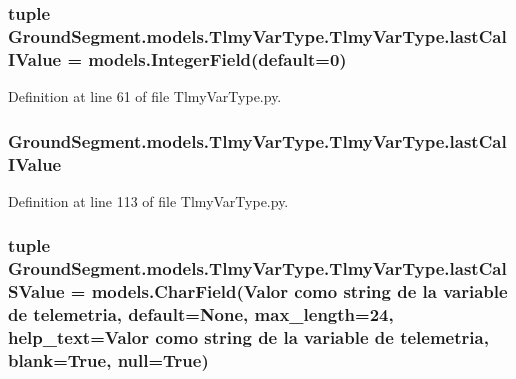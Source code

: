 \subsubsection[{last\+Cal\+I\+Value}]{\setlength{\rightskip}{0pt plus 5cm}tuple Ground\+Segment.\+models.\+Tlmy\+Var\+Type.\+Tlmy\+Var\+Type.\+last\+Cal\+I\+Value = models.\+Integer\+Field(default=0)\hspace{0.3cm}{\ttfamily [static]}}\label{class_ground_segment_1_1models_1_1_tlmy_var_type_1_1_tlmy_var_type_adb9ebf5cf2eb31fe549eadae8b7f1615}


Definition at line 61 of file Tlmy\+Var\+Type.\+py.

\hypertarget{class_ground_segment_1_1models_1_1_tlmy_var_type_1_1_tlmy_var_type_a26e2e133172878436da42acf364a07d7}{}
\subsubsection[{last\+Cal\+I\+Value}]{\setlength{\rightskip}{0pt plus 5cm}Ground\+Segment.\+models.\+Tlmy\+Var\+Type.\+Tlmy\+Var\+Type.\+last\+Cal\+I\+Value}\label{class_ground_segment_1_1models_1_1_tlmy_var_type_1_1_tlmy_var_type_a26e2e133172878436da42acf364a07d7}


Definition at line 113 of file Tlmy\+Var\+Type.\+py.

\hypertarget{class_ground_segment_1_1models_1_1_tlmy_var_type_1_1_tlmy_var_type_a29c38267c43d1309cef9066ac601d1e0}{}
\subsubsection[{last\+Cal\+S\+Value}]{\setlength{\rightskip}{0pt plus 5cm}tuple Ground\+Segment.\+models.\+Tlmy\+Var\+Type.\+Tlmy\+Var\+Type.\+last\+Cal\+S\+Value = models.\+Char\+Field(\textquotesingle{}Valor como string de la variable de telemetria\textquotesingle{}, default=None, max\+\_\+length=24, help\+\_\+text=\textquotesingle{}Valor como string de la variable de telemetria\textquotesingle{}, blank=True, null=True)\hspace{0.3cm}{\ttfamily [static]}}\label{class_ground_segment_1_1models_1_1_tlmy_var_type_1_1_tlmy_var_type_a29c38267c43d1309cef9066ac601d1e0}


